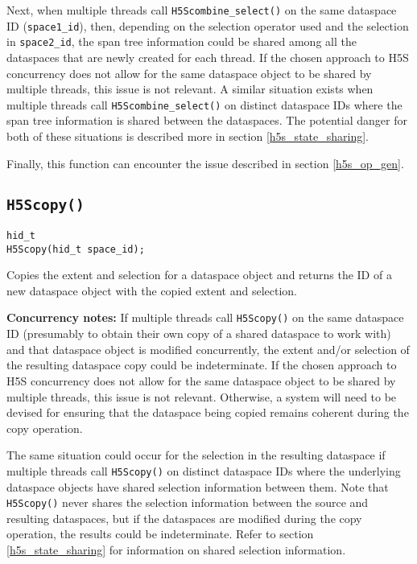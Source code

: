 \documentclass[../HDF5_RFC.tex]{subfiles}
\begin{document}
Next, when multiple threads call \texttt{H5Scombine\_select()} on the same dataspace ID
(\texttt{space1\_id}), then, depending on the selection operator used and the selection in
\texttt{space2\_id}, the span tree information could be shared among all the dataspaces that
are newly created for each thread. If the chosen approach to H5S concurrency does not allow
for the same dataspace object to be shared by multiple threads, this issue is not relevant.
A similar situation exists when multiple threads call \texttt{H5Scombine\_select()} on
distinct dataspace IDs where the span tree information is shared between the dataspaces.
The potential danger for both of these situations is described more in section
\ref{h5s_state_sharing}.

Finally, this function can encounter the issue described in section \ref{h5s_op_gen}.

\subsection{\texttt{H5Scopy()}}
\label{apdx:h5s_func_h5scopy}

\begin{verbatim}
hid_t
H5Scopy(hid_t space_id);
\end{verbatim}

Copies the extent and selection for a dataspace object and returns the ID of a new
dataspace object with the copied extent and selection.

\textbf{Concurrency notes:} If multiple threads call \texttt{H5Scopy()} on the same dataspace
ID (presumably to obtain their own copy of a shared dataspace to work with) and that dataspace
object is modified concurrently, the extent and/or selection of the resulting dataspace copy
could be indeterminate. If the chosen approach to H5S concurrency does not allow for the
same dataspace object to be shared by multiple threads, this issue is not relevant. Otherwise,
a system will need to be devised for ensuring that the dataspace being copied remains coherent
during the copy operation.

The same situation could occur for the selection in the resulting dataspace if multiple threads
call \texttt{H5Scopy()} on distinct dataspace IDs where the underlying dataspace objects have
shared selection information between them. Note that \texttt{H5Scopy()} never shares the
selection information between the source and resulting dataspaces, but if the dataspaces are
modified during the copy operation, the results could be indeterminate. Refer to section
\ref{h5s_state_sharing} for information on shared selection information.
\end{document}
